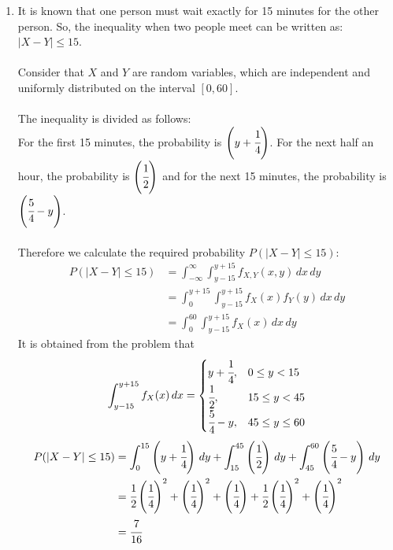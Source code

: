 \documentclass{article}
\begin{document}
\begin{enumerate}
\begin{enumerate}
    \item 
        It is known that one person must wait exactly for 15 minutes for the other person. So, the inequality when two people meet can be written as: \(|X - Y| \leq 15\).\\\\
        Consider that \(X\) and \(Y\) are random variables, which are independent and uniformly distributed on the interval \([0,60]\).\\\\
        The inequality is divided as follows:\\
        For the first 15 minutes, the probability is \(\left(y + \cfrac{1}{4}\right)\). For the next half an hour, the probability is \(\left(\cfrac{1}{2}\right)\) and for the next 15 minutes, the probability is \(\left(\cfrac{5}{4} - y\right)\).\\\\
        Therefore we calculate the required probability \(P(|X - Y| \leq 15)\):
        \begin{align*}
            P(|X - Y| \leq 15) &= \int_{-\infty}^{\infty} \int_{y-15}^{y+15} f_{X,Y}(x,y) \,dx\,dy\\
            &= \int_0^{y+15} \int_{y-15}^{y+15} f_{X}(x) f_{Y}(y) \,dx\,dy\\
            &= \int_0^{60}\int_{y-15}^{y+15} f_{X}(x) \,dx\,dy
        \end{align*}
        It is obtained from the problem that
        \[
            \int_{y-15}^{y+15} f_{X}(x) \,dx = 
            \begin{cases} 
            y + \cfrac{1}{4}, & 0 \leq y < 15 \\
            \cfrac{1}{2}, & 15 \leq y < 45 \\
            \cfrac{5}{4} - y, & 45 \leq y \leq 60 
            \end{cases}
        \]
        \begin{align*}
            P(|X - Y| \leq 15) &= \int_{0}^{15} \left(y + \cfrac{1}{4}\right) \,dy + \int_{15}^{45} \left(\cfrac{1}{2}\right) \,dy + \int_{45}^{60} \left(\cfrac{5}{4} - y\right) \,dy\\
            &= \cfrac{1}{2} \left(\cfrac{1}{4}\right)^2 + \left(\cfrac{1}{4}\right)^2 + \left(\cfrac{1}{4}\right) + \cfrac{1}{2} \left(\cfrac{1}{4}\right)^2 + \left(\cfrac{1}{4}\right)^2\\
            &= \cfrac{7}{16}
        \end{align*}
    \end{enumerate}


\end{enumerate}
\end{document}
